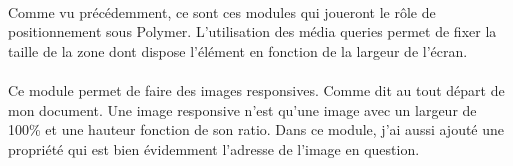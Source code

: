 \documentclass{article}
\begin{document}
\vspace{0.5cm}\\
Comme vu pr\'ec\'edemment, ce sont ces modules qui joueront le r\^ole de positionnement sous Polymer. L'utilisation des m\'edia queries permet de fixer la taille de la zone dont dispose l'\'el\'ement en fonction de la largeur de l'\'ecran.
\vspace{0.5cm}\\
\vspace{0.5cm}\\
Ce module permet de faire des images responsives. Comme dit au tout d\'epart de mon document. Une image responsive n'est qu'une image avec un largeur de 100\% et une hauteur fonction de son ratio. Dans ce module, j'ai aussi ajout\'e une propri\'et\'e qui est bien \'evidemment l'adresse de l'image en question.
\end{document}
